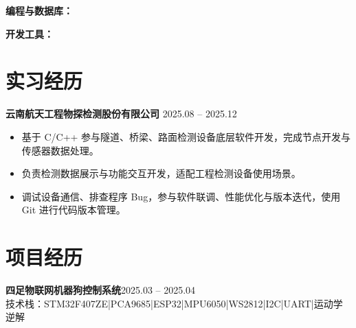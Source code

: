 \documentclass[10pt,a4paper]{article}
\newcommand{\projectblock}[3]{%
    {\bfseries\color{darktext}#1}\hfill{\color{graytext}#2}\\%
    {\small\color{graytext}#3}%
    \vspace{0.2em}%
}
\begin{document}
{\bfseries\color{primary}编程与数据库：}

\vspace{2pt}

{\bfseries\color{primary}开发工具：}

\section{\faBriefcase\hspace{0.4em}实习经历}

{\bfseries 云南航天工程物探检测股份有限公司}\hfill{\color{graytext} 2025.08 -- 2025.12}

\vspace{2pt}

\begin{itemize}[leftmargin=1.5em, itemsep=2pt, parsep=0pt, topsep=2pt]
    \item 基于 C/C++ 参与隧道、桥梁、路面检测设备底层软件开发，完成节点开发与传感器数据处理。
    \item 负责检测数据展示与功能交互开发，适配工程检测设备使用场景。
    \item 调试设备通信、排查程序 Bug，参与软件联调、性能优化与版本迭代，使用 Git 进行代码版本管理。
\end{itemize}

\vspace{0.15em}

\section{\faProjectDiagram\hspace{0.4em}项目经历}

\projectblock{四足物联网机器狗控制系统}{2025.03 -- 2025.04}{技术栈：STM32F407ZE\hspace{0.3em}|\hspace{0.3em}PCA9685\hspace{0.3em}|\hspace{0.3em}ESP32\hspace{0.3em}|\hspace{0.3em}MPU6050\hspace{0.3em}|\hspace{0.3em}WS2812\hspace{0.3em}|\hspace{0.3em}I2C\hspace{0.3em}|\hspace{0.3em}UART\hspace{0.3em}|\hspace{0.3em}运动学逆解}
\end{document}
